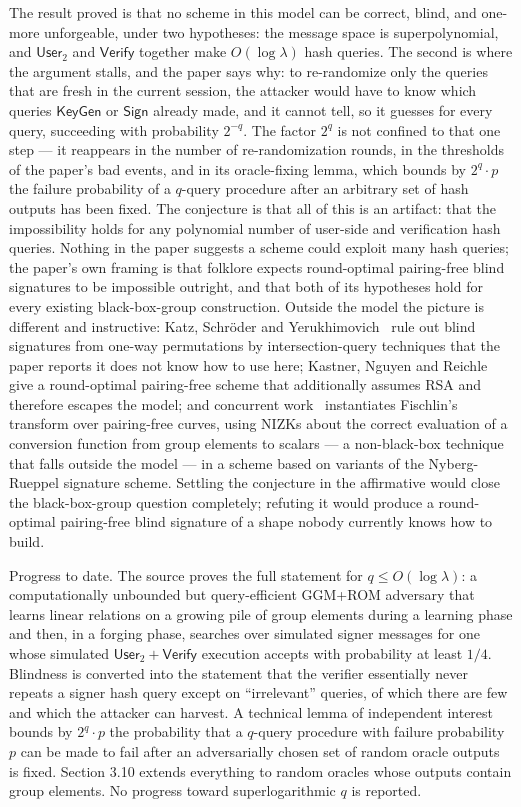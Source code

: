 \documentclass{aicr-conjecture}
\newcommand{\KeyGen}{\mathsf{KeyGen}}
\newcommand{\Usertwo}{\mathsf{User}_2}
\newcommand{\Sig}{\mathsf{Sign}}
\newcommand{\Ver}{\mathsf{Verify}}
\begin{document}
The result proved is that no scheme in this model can be correct, blind,
and one-more unforgeable, under two hypotheses: the message space is
superpolynomial, and $\Usertwo$ and $\Ver$ together make $O(\log\lambda)$
hash queries. The second is where the argument stalls, and the paper
says why: to re-randomize only the queries that are fresh in the current
session, the attacker would have to know which queries $\KeyGen$ or
$\Sig$ already made, and it cannot tell, so it guesses for every query,
succeeding with probability $2^{-q}$. The factor $2^{q}$ is not confined
to that one step --- it reappears in the number of re-randomization
rounds, in the thresholds of the paper's bad events, and in its
oracle-fixing lemma, which bounds by $2^{q}\cdot p$ the failure
probability of a $q$-query procedure after an arbitrary set of hash
outputs has been fixed. The conjecture is that all of this is an
artifact: that the impossibility holds for any polynomial number of
user-side and verification hash queries. Nothing in the paper suggests a
scheme could exploit many hash queries; the paper's own framing is that
folklore expects round-optimal pairing-free blind signatures to be
impossible outright, and that both of its hypotheses hold for every
existing black-box-group construction. Outside the model the picture is
different and instructive: Katz, Schr\"oder and
Yerukhimovich~\cite{KSY11} rule out blind signatures from one-way
permutations by intersection-query techniques that the paper reports it
does not know how to use here; Kastner, Nguyen and Reichle~\cite{KNR24}
give a round-optimal pairing-free scheme that additionally assumes RSA
and therefore escapes the model; and concurrent work~\cite{KTZ26}
instantiates Fischlin's transform over pairing-free curves, using NIZKs
about the correct evaluation of a conversion function from group
elements to scalars --- a non-black-box technique that falls outside the
model --- in a scheme based on variants of the Nyberg-Rueppel signature
scheme. Settling the conjecture in the affirmative would close the
black-box-group question completely; refuting it would produce a
round-optimal pairing-free blind signature of a shape nobody currently
knows how to build.

Progress to date. The source proves the full statement for
$q\le O(\log\lambda)$: a computationally unbounded but query-efficient
GGM+ROM adversary that learns linear relations on a growing pile of
group elements during a learning phase and then, in a forging phase,
searches over simulated signer messages for one whose simulated
$\Usertwo{+}\Ver$ execution accepts with probability at least $1/4$.
Blindness is converted into the statement that the verifier essentially
never repeats a signer hash query except on ``irrelevant'' queries, of
which there are few and which the attacker can harvest. A technical
lemma of independent interest bounds by $2^{q}\cdot p$ the probability
that a $q$-query procedure with failure probability $p$ can be made to
fail after an adversarially chosen set of random oracle outputs is
fixed. Section 3.10 extends everything to random oracles whose outputs
contain group elements. No progress toward superlogarithmic $q$ is
reported.
\end{document}

